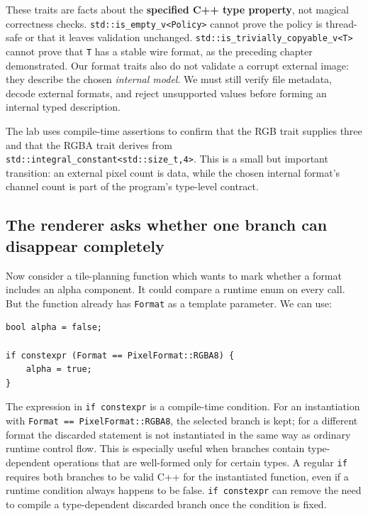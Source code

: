 These traits are facts about the \textbf{specified C++ type property}, not magical correctness checks. \texttt{std::is\_empty\_v\textless{}Policy\textgreater{}} cannot prove the policy is thread-safe or that it leaves validation unchanged. \texttt{std::is\_trivially\_copyable\_v\textless{}T\textgreater{}} cannot prove that \texttt{T} has a stable wire format, as the preceding chapter demonstrated. Our format traits also do not validate a corrupt external image: they describe the chosen \emph{internal model}. We must still verify file metadata, decode external formats, and reject unsupported values before forming an internal typed description.

The lab uses compile-time assertions to confirm that the RGB trait supplies three and that the RGBA trait derives from \texttt{std::integral\_constant\textless{}std::size\_t,4\textgreater{}}. This is a small but important transition: an external pixel count is data, while the chosen internal format's channel count is part of the program's type-level contract.

\subsection{The renderer asks whether one branch can disappear completely}\label{01-foundations-i-ch005-the-renderer-asks-whether-one-branch-can-disappear-completely}

Now consider a tile-planning function which wants to mark whether a format includes an alpha component. It could compare a runtime enum on every call. But the function already has \texttt{Format} as a template parameter. We can use:

\begin{verbatim}
bool alpha = false;

if constexpr (Format == PixelFormat::RGBA8) {
    alpha = true;
}
\end{verbatim}

The expression in \texttt{if\ constexpr} is a compile-time condition. For an instantiation with \texttt{Format\ ==\ PixelFormat::RGBA8}, the selected branch is kept; for a different format the discarded statement is not instantiated in the same way as ordinary runtime control flow. This is especially useful when branches contain type-dependent operations that are well-formed only for certain types. A regular \texttt{if} requires both branches to be valid C++ for the instantiated function, even if a runtime condition always happens to be false. \texttt{if\ constexpr} can remove the need to compile a type-dependent discarded branch once the condition is fixed.

